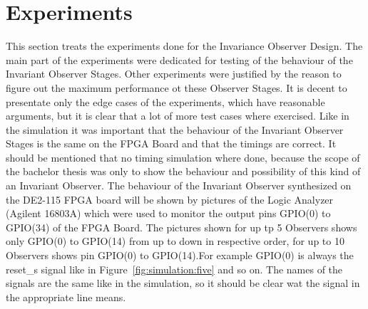\newpage
\section{Experiments}
This section treats the experiments done for the Invariance Observer Design. The main part of the experiments were dedicated for testing of the behaviour of the
Invariant Observer Stages. Other experiments were justified by the reason to figure out the maximum performance ot these Observer Stages.
It is decent to presentate only the edge cases of the experiments, which have reasonable arguments, but it is clear that a lot of more test cases where exercised.
Like in the simulation it was important that the behaviour of the Invariant Observer Stages is the same on the FPGA Board and that the timings are correct.
It should be mentioned that no timing simulation where done, because the scope of the bachelor thesis was only to show the behaviour and possibility of this kind of an Invariant Observer. 
The behaviour of the Invariant Observer synthesized on the DE2-115 FPGA board will be shown by pictures of the Logic Analyzer (Agilent 16803A) which were used to monitor
the output pins GPIO(0) to GPIO(34) of the FPGA Board. The pictures shown for up tp 5 Observers shows only GPIO(0) to GPIO(14) from up to down in respective order, for up to 10 Observers shows 
pin GPIO(0) to GPIO(14).For example GPIO(0) is always the reset\_s signal like in Figure~\ref{fig:simulation:five} and so on. 
The names of the signals are the same like in the simulation, so it should be clear wat the signal in the appropriate line means.
